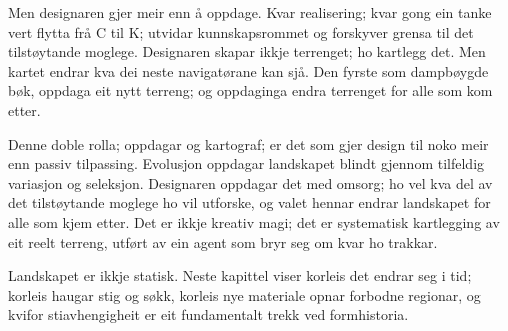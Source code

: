 Men designaren gjer meir enn å oppdage. Kvar realisering; kvar gong ein tanke vert flytta frå C til K; utvidar kunnskapsrommet og forskyver grensa til det tilstøytande moglege. Designaren skapar ikkje terrenget; ho kartlegg det. Men kartet endrar kva dei neste navigatørane kan sjå. Den fyrste som dampbøygde bøk, oppdaga eit nytt terreng; og oppdaginga endra terrenget for alle som kom etter.

Denne doble rolla; oppdagar og kartograf; er det som gjer design til noko meir enn passiv tilpassing. Evolusjon oppdagar landskapet blindt gjennom tilfeldig variasjon og seleksjon. Designaren oppdagar det med omsorg; ho vel kva del av det tilstøytande moglege ho vil utforske, og valet hennar endrar landskapet for alle som kjem etter. Det er ikkje kreativ magi; det er systematisk kartlegging av eit reelt terreng, utført av ein agent som bryr seg om kvar ho trakkar.

\begin{overgang}
Landskapet er ikkje statisk. Neste kapittel viser korleis det endrar seg i tid; korleis haugar stig og søkk, korleis nye materiale opnar forbodne regionar, og kvifor stiavhengigheit er eit fundamentalt trekk ved formhistoria.
\end{overgang}
